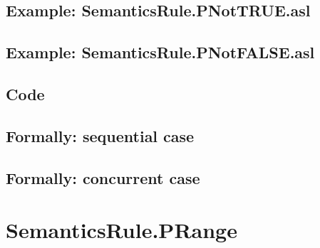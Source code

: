 \documentclass{book}
\begin{document}
    \subsection{Example: SemanticsRule.PNotTRUE.asl}

    \subsection{Example: SemanticsRule.PNotFALSE.asl}

  \subsection{Code}

\begin{emptyformal}
  \subsection{Formally: sequential case}

  \subsection{Formally: concurrent case}
\end{emptyformal}


\section{SemanticsRule.PRange \label{sec:SemanticsRule.PRange}}
\end{document}
